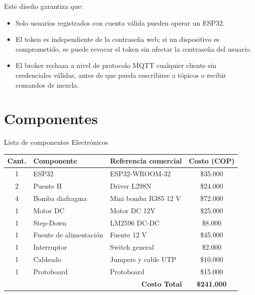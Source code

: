 \documentclass[conference]{IEEEtran}
\begin{document}
Este dise\~no garantiza que:
\begin{itemize}
    \item Solo usuarios registrados con cuenta v\'alida pueden operar un ESP32.
    \item El token es independiente de la contrase\~na web; si un dispositivo es comprometido, se puede revocar el token sin afectar la contrase\~na del usuario.
    \item El broker rechaza a nivel de protocolo MQTT cualquier cliente sin credenciales v\'alidas, antes de que pueda suscribirse a t\'opicos o recibir comandos de mezcla.
\end{itemize}

\section{Componentes}
\begin{table}[ht]
{Lista de componentes Electr\'onicos}
\label{tab:componentes_costos}
\centering
\footnotesize
\renewcommand{\arraystretch}{1.5}
\begin{tabular}{|c|p{2.3cm}|p{2.8cm}|c|}
\hline
\textbf{Cant.} & \textbf{Componente} & \textbf{Referencia comercial} & \textbf{Costo (COP)} \\
\hline
1 & ESP32 & ESP32-WROOM-32 & \$35.000 \\
\hline
2 & Puente H & Driver L298N & \$24.000 \\
\hline
4 & Bomba diafragma & Mini bomba R385 12 V & \$72.000 \\
\hline
1 & Motor DC  & Motor DC 12V & \$25.000 \\
\hline
1 & Step-Down & LM2596 DC-DC & \$8.000 \\
\hline
1 & Fuente de alimentaci\'on & Fuente 12 V   & \$45.000 \\
\hline
1 & Interruptor & Switch general & \$2.000 \\
\hline
1 & Cableado & Jumpers y cable UTP & \$10.000 \\
\hline
1 & Protoboard & Protoboard & \$15.000 \\
\hline
\multicolumn{3}{|r|}{\textbf{Costo Total}} & \textbf{\$241.000} \\
\hline
\end{tabular}
\end{table}
\end{document}
